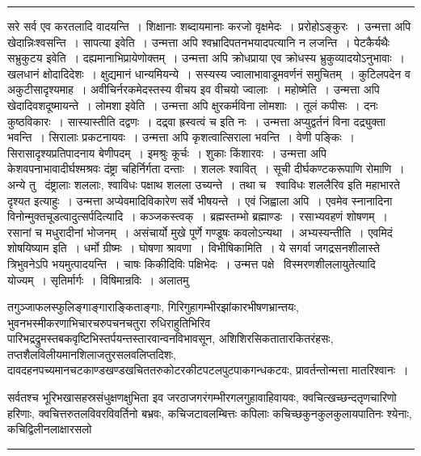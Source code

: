 \documentclass[11pt, openany]{book}
\begin{document}
\vspace{2mm}
\hrule

\noindent
{\s सरे सर्व एव करतलादि वादयन्ति~। शिक्षानाः शब्दायमानाः करजो वृक्षमेदः~। प्ररोहोऽङ्कुरः~। उन्मत्ता अपि खेदान्निःश्वसन्ति~। {\qtt सापत्या इवेति~।} उन्मत्ता अपि श्वभ्रादिपतनभयादपत्यानि न लजन्ति~। पेटकैर्यथैः {\qtt सभ्रुकुटय इवेति}~। दह्यमानाभिप्रायेणोक्तम्~। उन्मत्ता अपि क्रोधप्राया एव क्रोधस्य भ्रुकुव्यादयोऽनुभावाः~। खलधानं क्षोदादिदेशः~। क्षुद्यमानं धान्यमियन्ये~। सस्यस्य ज्वालाभावाडूमवर्णनं समुचितम्~। कुटिलपदेन व अकुटीसादृश्यमाह~। अवीचिर्नरकमेदस्तस्य वीचय इव वीचयो ज्वालाः~। {\qtt महोष्मेति}~। उन्मत्ता अपि खेदादिवशदूष्मायन्ते~। {\qtt लोमशा इवेति}~। उन्मत्ता अपि क्षुरकर्मविना लोमशाः~। तूलं कपीसः~। दनः कुष्ठविकारः~। सास्यास्तीति दद्वणः~। {\qt दद्र्वा ह्रस्वत्वं च} इति नः~। उन्मत्ता अप्युद्वर्तनं विना दद्र्युक्ता भवन्ति~। सिरालाः प्रकटनायवः~। उन्मत्ता अपि कृशत्वात्सिराला भवन्ति~। वेणी पङ्किः~। सिरासादृश्यप्रतिपादनाय बेणीपदम्~। इमश्रुः कूर्चः~। शुकाः किंशारवः~। उन्मत्ता अपि केशवपनाभावादीर्घश्मश्रवः दंष्ट्रा चहिर्निर्गता दन्ताः~। शललः श्वावित्~। सूची दीर्घकण्टकरूपाणि रोमाणि~। अन्ये तु \textendash\ दंष्ट्रालाः शललाः, श्वाविधः पक्षाथ शलला उच्यन्ते~। तथा च \textendash\ {\qt श्वाविधः शललैरिव} इति महाभारते दृश्यत इत्याहुः~। उन्मत्ता अप्येवमादिविकारेण सर्वे भीषयन्ते~। एवं जिह्वाला अपि~। एवमेव स्नानादिना विनोन्मुक्तचूडत्वादुत्सर्पदित्यादि~। कञ्जकस्त्वक्~। ब्रह्मस्तम्भो ब्रह्माण्डः~। रसाभ्यवहणं शोषणम्~। रसानां च मधुरादीनां भोजनम्~। {\qt असंचार्यो मुखे पूर्णे गण्डूषः कवलोऽन्यथा}~। अभ्यस्यन्तीति~। एवमिदं शोषयिष्याम इति~। धर्मो ग्रीष्मः~। घोषणा श्रावणा~। {\qtt विभीषिकामिति}~। ये सगर्वा जगद्रसनशीलास्ते त्रिभुवनेऽपि भयमुत्पादयन्ति~। चाषः किकीदिविः पक्षिभेदः~। उन्मत्त पक्षे \textendash\ विस्मरणशीललायुतेत्यादि योज्यम्~। सृतिर्मार्गः~। विषिमान्रविः~। अलातमु\textendash}

\newpage

\noindent
तगुञ्जाफलस्फुलिङ्गाङ्गाराङ्किताङ्गाः, गिरिगुहागम्भीरझांकारभीषणभ्रान्तयः, भुवनभस्मीकरणाभिचारचरुपचनचतुरा रुधिराहुतिभिरिव पारिभद्रद्रुमस्तबकवृष्टिभिस्तर्पयन्तस्तारवान्वनविभावसून, अशिशिरसिकतातारकितरंहसः, तप्तशैलविलीयमानशिलाजतुरसलवलिप्तदिशः, दावदहनपच्यमानचटकाण्डखण्डखचिततरुकोटरकीटपटलपुटपाकगन्धकटवः, प्रावर्तन्तोन्मत्ता मातरिश्वानः~।

सर्वतश्च भूरिभखासहस्रसंधुक्षणक्षुभिता इव जरठाजगरंगम्भीरगलगुहावाहिवायवः, क्वचित्खच्छन्दतृणचारिणो हरिणाः, क्वचित्तरुतलविवरविवर्तिनो बभ्रवः, कचिजटावलम्बित्तः कपिलाः कचिच्छकुनकुलकुलायपातिनः श्येनाः, कचिद्विलीनलाक्षारसलो\textendash

\vspace{2mm}
\hrule
\end{document}
